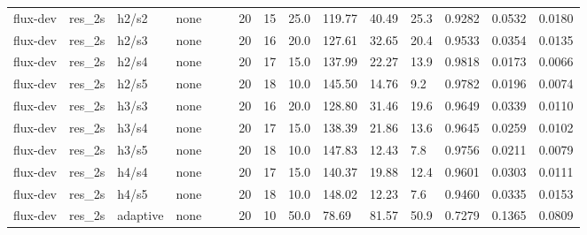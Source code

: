 \begin{tabular}{llllllrrlllllll}
flux-dev & res_2s & h2/s2 & none &  &  & 20 & 15 & 25.0 & 119.77 & 40.49 & 25.3 & 0.9282 & 0.0532 & 0.0180 \\
flux-dev & res_2s & h2/s3 & none &  &  & 20 & 16 & 20.0 & 127.61 & 32.65 & 20.4 & 0.9533 & 0.0354 & 0.0135 \\
flux-dev & res_2s & h2/s4 & none &  &  & 20 & 17 & 15.0 & 137.99 & 22.27 & 13.9 & 0.9818 & 0.0173 & 0.0066 \\
flux-dev & res_2s & h2/s5 & none &  &  & 20 & 18 & 10.0 & 145.50 & 14.76 & 9.2 & 0.9782 & 0.0196 & 0.0074 \\
flux-dev & res_2s & h3/s3 & none &  &  & 20 & 16 & 20.0 & 128.80 & 31.46 & 19.6 & 0.9649 & 0.0339 & 0.0110 \\
flux-dev & res_2s & h3/s4 & none &  &  & 20 & 17 & 15.0 & 138.39 & 21.86 & 13.6 & 0.9645 & 0.0259 & 0.0102 \\
flux-dev & res_2s & h3/s5 & none &  &  & 20 & 18 & 10.0 & 147.83 & 12.43 & 7.8 & 0.9756 & 0.0211 & 0.0079 \\
flux-dev & res_2s & h4/s4 & none &  &  & 20 & 17 & 15.0 & 140.37 & 19.88 & 12.4 & 0.9601 & 0.0303 & 0.0111 \\
flux-dev & res_2s & h4/s5 & none &  &  & 20 & 18 & 10.0 & 148.02 & 12.23 & 7.6 & 0.9460 & 0.0335 & 0.0153 \\
flux-dev & res_2s & adaptive & none &  &  & 20 & 10 & 50.0 & 78.69 & 81.57 & 50.9 & 0.7279 & 0.1365 & 0.0809 \\
\bottomrule
\end{tabular}
